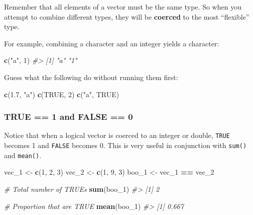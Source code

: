 \documentclass[
]{book}
\newenvironment{Shaded}{\begin{snugshade}}{\end{snugshade}}
\newcommand{\CommentTok}[1]{\textcolor[rgb]{0.56,0.35,0.01}{\textit{#1}}}
\newcommand{\DecValTok}[1]{\textcolor[rgb]{0.00,0.00,0.81}{#1}}
\newcommand{\FloatTok}[1]{\textcolor[rgb]{0.00,0.00,0.81}{#1}}
\newcommand{\KeywordTok}[1]{\textcolor[rgb]{0.13,0.29,0.53}{\textbf{#1}}}
\newcommand{\NormalTok}[1]{#1}
\newcommand{\OperatorTok}[1]{\textcolor[rgb]{0.81,0.36,0.00}{\textbf{#1}}}
\newcommand{\OtherTok}[1]{\textcolor[rgb]{0.56,0.35,0.01}{#1}}
\newcommand{\StringTok}[1]{\textcolor[rgb]{0.31,0.60,0.02}{#1}}
\begin{document}
Remember that all elements of a vector must be the same type. So when you attempt to combine different types, they will be \textbf{coerced} to the most ``flexible'' type.

For example, combining a character and an integer yields a character:

\begin{Shaded}
\begin{Highlighting}[]
\KeywordTok{c}\NormalTok{(}\StringTok{"a"}\NormalTok{, }\DecValTok{1}\NormalTok{)}
\CommentTok{#> [1] "a" "1"}
\end{Highlighting}
\end{Shaded}

Guess what the following do without running them first:

\begin{Shaded}
\begin{Highlighting}[]
\KeywordTok{c}\NormalTok{(}\FloatTok{1.7}\NormalTok{, }\StringTok{"a"}\NormalTok{) }
\KeywordTok{c}\NormalTok{(}\OtherTok{TRUE}\NormalTok{, }\DecValTok{2}\NormalTok{) }
\KeywordTok{c}\NormalTok{(}\StringTok{"a"}\NormalTok{, }\OtherTok{TRUE}\NormalTok{) }
\end{Highlighting}
\end{Shaded}

\hypertarget{true-1-and-false-0}{%
\subsubsection*{TRUE == 1 and FALSE == 0}\label{true-1-and-false-0}}

Notice that when a logical vector is coerced to an integer or double, \texttt{TRUE} becomes 1 and \texttt{FALSE} becomes 0. This is very useful in conjunction with \texttt{sum()} and \texttt{mean()}.

\begin{Shaded}
\begin{Highlighting}[]
\NormalTok{vec_}\DecValTok{1}\NormalTok{ <-}\StringTok{ }\KeywordTok{c}\NormalTok{(}\DecValTok{1}\NormalTok{, }\DecValTok{2}\NormalTok{, }\DecValTok{3}\NormalTok{)}
\NormalTok{vec_}\DecValTok{2}\NormalTok{ <-}\StringTok{ }\KeywordTok{c}\NormalTok{(}\DecValTok{1}\NormalTok{, }\DecValTok{9}\NormalTok{, }\DecValTok{3}\NormalTok{)}
\NormalTok{boo_}\DecValTok{1}\NormalTok{ <-}\StringTok{ }\NormalTok{vec_}\DecValTok{1} \OperatorTok{==}\StringTok{ }\NormalTok{vec_}\DecValTok{2}

\CommentTok{# Total number of TRUEs}
\KeywordTok{sum}\NormalTok{(boo_}\DecValTok{1}\NormalTok{)}
\CommentTok{#> [1] 2}

\CommentTok{# Proportion that are TRUE}
\KeywordTok{mean}\NormalTok{(boo_}\DecValTok{1}\NormalTok{)}
\CommentTok{#> [1] 0.667}
\end{Highlighting}
\end{Shaded}
\end{document}
